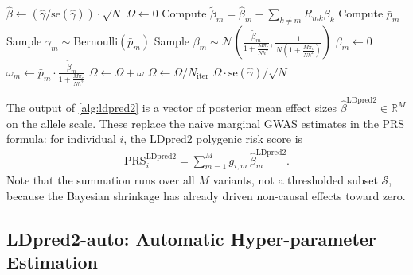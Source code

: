 \begin{algorithm}
\caption{LDpred2 Gibbs Sampler with hyper-parameters $\pi_c$ and $h^2$}
\label{alg:ldpred2}
\begin{algorithmic}[1]
\State $\hat{\beta} \leftarrow (\hat{\gamma} / \text{se}(\hat{\gamma})) \cdot \sqrt{N}$ 
\State $\Omega \leftarrow 0$ 
        \State Compute $\tilde{\beta}_m = \hat{\beta}_m - \sum_{k \neq m} R_{mk}\beta_k$ 
        \State Compute $\bar{p}_m$ 
        \State Sample $\gamma_m \sim \text{Bernoulli}(\bar{p}_m)$
            \State Sample $\beta_m \sim \mathcal{N}\left(\frac{\tilde{\beta}_m}{1 + \frac{M\pi_c}{Nh^2}}, \frac{1}{N\left(1 + \frac{M\pi_c}{Nh^2}\right)}\right)$
        \Else
            \State $\beta_m \leftarrow 0$
        \EndIf
        \State $\omega_m \leftarrow \bar{p}_m \cdot \frac{\tilde{\beta}_m}{1 + \frac{M\pi_c}{Nh^2}}$ 
    \EndFor
        \State $\Omega \leftarrow \Omega + \omega$ 
    \EndIf
\EndFor
\State $\Omega \leftarrow \Omega / N_{\text{iter}}$ 
\State \Return $\Omega \cdot \text{se}(\hat{\gamma}) / \sqrt{N}$ 
\end{algorithmic}
\end{algorithm}

The output of \autoref{alg:ldpred2} is a vector of posterior mean effect sizes $\hat{\beta}^{\text{LDpred2}} \in \mathbb{R}^M$ on the allele scale. These replace the naive marginal GWAS estimates in the PRS formula: for individual $i$, the LDpred2 polygenic risk score is
\begin{align*}
    \text{PRS}_i^{\text{LDpred2}} = \sum_{m=1}^{M} g_{i,m}\, \hat{\beta}_m^{\text{LDpred2}}.
\end{align*}
Note that the summation runs over all $M$ variants, not a thresholded subset $\mathcal{S}$, because the Bayesian shrinkage has already driven non-causal effects toward zero.

\subsection{LDpred2-auto: Automatic Hyper-parameter Estimation}

